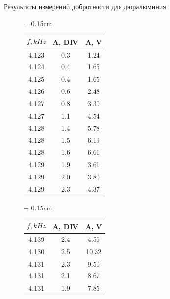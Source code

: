 \documentclass[xcolor=table]{beamer}
\begin{document}
\begin{frame}{Результаты измерений добротности для дюралюминия}
    \begin{figure}[ht]
        \begin{minipage}{.5\textwidth}
            \begin{table}
                \tabcolsep = 0.15cm
                \centering
                \begin{tabular}{|c|c|c|}
                    \hline
                    $$f, kHz$$ & A, DIV & A, V \\
                    \hline
                    4.123 & 0.3	& 1.24 \\ 
                    4.124 & 0.4	& 1.65 \\ 
                    4.125 &	0.4	& 1.65 \\
                    4.126 &	0.6	& 2.48 \\
                    4.127 &	0.8	& 3.30 \\
                    4.127 &	1.1	& 4.54 \\
                    4.128 &	1.4	& 5.78 \\
                    4.128 &	1.5	& 6.19 \\
                    4.128 &	1.6	& 6.61 \\
                    4.129 &	1.9	& 3.61 \\
                    4.129 &	2.0	& 3.80 \\
                    4.129 &	2.3	& 4.37 \\
                    \hline
                \end{tabular}
            \end{table}
        \end{minipage}%
        \begin{minipage}{.5\textwidth}
            \begin{table}
                \tabcolsep = 0.15cm
                \centering
                \begin{tabular}{|c|c|c|}
                    \hline
                    $$f, kHz$$ & A, DIV & A, V \\
                    \hline
                    4.139 &	2.4	& 4.56 \\
                    4.130 &	2.5	& 10.32 \\
                    4.131 &	2.3	& 9.50 \\
                    4.131 &	2.1	& 8.67 \\
                    4.131 &	1.9	& 7.85 \\

\end{tabular}
\end{table}
\end{minipage}
\end{figure}
\end{frame}
\end{document}
